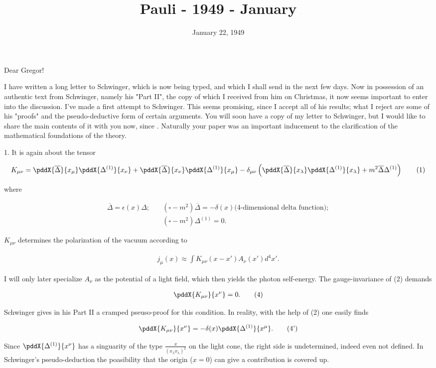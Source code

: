 \documentclass{article}
\title{Pauli - 1949 - January}
\newcommand{\nc}[2]{
  \newcommand{#1}{#2}
}
\newcommand{\nequ}[2]{
\begin{align*}
#1
\tag{#2}
\end{align*}
}
\begin{document}
\date{January 22, 1949}
\tags{}

Dear Gregor!

I have written a long letter to Schwinger, which is now being typed, and which I shall send in the next few days. Now in possession of an authentic text from Schwinger, namely his "Part II", the copy of which I received from him on Christmas, it now seems important to enter into the discussion. I've made a first attempt to  Schwinger. This seems promising, since I accept all of his results; what I reject are some of his "proofs" and the pseudo-deductive form of certain arguments. You will soon have a copy of my letter to Schwinger, but I would like to share the main contents of it with you now, since . Naturally your paper was an important inducement to the clarification of the mathematical foundations of the theory.
\nc{\Dbar}{\overline{\Delta}}
\nc{\Done}{\Delta^{(1)}}

1. It is again about the tensor
\nequ{
K_{\mu\nu} = \pddX{\Dbar}{x_\mu}\pddX{\Done}{x_\nu} + \pddX{\Dbar}{x_\nu}\pddX{\Done}{x_\mu} 
 - \delta_{\mu\nu}\left(\pddX{\Dbar}{x_\lambda} \pddX{\Done}{x_\lambda} + m^2 \Dbar\Done \right)
}{1}
where
\nequ{
\Dbar = \epsilon(x)\Delta;\quad &(\square - m^2)\Dbar = -\delta(x) \text{(4-dimensional delta function)};\\
&(\square - m^2)\Done = 0.
}{2}
$K_{\mu\nu}$ determines the polarization of the vacuum according to
\nequ{
j_\mu(x) \approx \int K_{\mu\nu}(x-x')A_\nu(x') {d^4 x'}.
}{3}

I will only later specialize $A_\nu$ as the potential of a light field, which then yields the photon self-energy. The gauge-invariance of (2) demands
\nequ{
\pddX{K_{\mu\nu}}{x^\nu} = 0.
}{4}
Schwinger gives in his Part II a cramped pseuso-proof for this condition. In reality, with the help of (2) one easily finds
\nequ{
\pddX{K_{\mu\nu}}{x^\nu} = -\delta(x)\pddX{\Done}{x^\mu}.
}{4'}
Since $\pddX{\Done}{x^\nu}$ has a singuarity of the type $\frac{x}{(x_\lambda x_\lambda)^2}$ on the light cone, the right side is undetermined, indeed even not defined. In Schwinger's pseudo-deduction the poasibility that the origin ($x=0$) can give a contribution is covered up.

\nc{\varx}{\mathfrak{x}}
\end{document}
